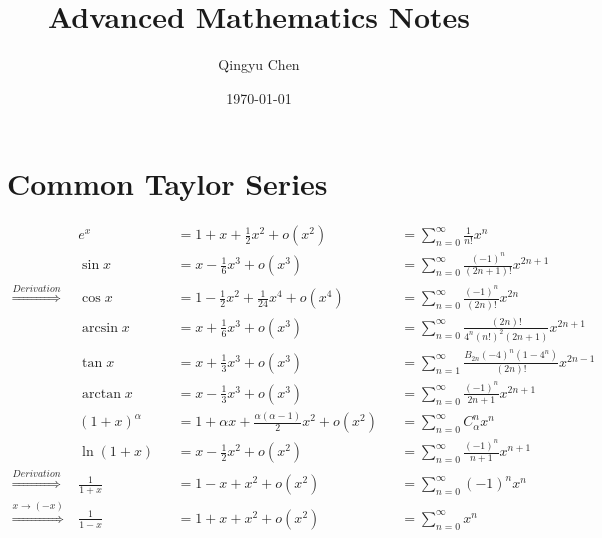 \documentclass{article}
\title{Advanced Mathematics Notes}
\author{Qingyu Chen}
\date{\today}
\begin{document}
	\large
	\setlength{\baselineskip}{4em}
	
	\renewcommand{\d}[1][x]{\ \text{d}#1}
	
	\maketitle
	
	\tableofcontents
	
	\newpage
	
	\section{Common Taylor Series}
	
	\begin{align}
		& e^x & & = 1 + x + \frac{1}{2} x^2 + o(x^2) && = \sum_{n = 0}^{\infty} \frac{1}{n!} x^n
		\\
		& \sin x & & = x - \frac{1}{6} x^3 + o(x^3) && = \sum_{n = 0}^{\infty} \frac{(-1)^n}{(2n + 1)!} x^{2n + 1}
		\\
		\stackrel{Derivation}{\Longrightarrow} \ & \cos x & & = 1 - \frac{1}{2} x^2 + \frac{1}{24} x^4 + o(x^4) && = \sum_{n = 0}^{\infty} \frac{(-1)^n}{(2n)!} x^{2n}
		\\
		& \arcsin x & & = x + \frac{1}{6} x^3 + o(x^3) && = \sum_{n = 0}^{\infty} \frac{(2n)!}{4^n (n!)^2 (2n + 1)} x^{2n + 1}
		\\
		& \tan x & & = x + \frac{1}{3} x^3 + o(x^3) && = \sum_{n = 1}^{\infty} \frac{B_{2n} (-4)^n (1 - 4^n)}{(2n)!} x^{2n - 1}
		\\
		& \arctan x & & = x - \frac{1}{3} x^3 + o(x^3) && = \sum_{n = 0}^{\infty} \frac{(-1)^n}{2n + 1} x^{2n + 1}
		\\
		& (1 + x)^\alpha & & = 1 + \alpha x + \frac{\alpha (\alpha - 1)}{2} x^2 + o(x^2) && = \sum_{n = 0}^{\infty} C_{\alpha}^{n} x^n
		\\
		& \ln{(1 + x)} & & = x - \frac{1}{2} x^2 + o(x^2) && = \sum_{n = 0}^{\infty} \frac{(-1)^n}{n + 1} x^{n + 1}
		\\
		\stackrel{Derivation}{\Longrightarrow} \ & \frac{1}{1 + x} & & = 1 - x + x^2 + o(x^2) && = \sum_{n = 0}^{\infty} (-1)^n x^n
		\\
		\stackrel{x \rightarrow (-x)}{\Longrightarrow} \ & \frac{1}{1 - x} & & = 1 + x + x^2 + o(x^2) && = \sum_{n = 0}^{\infty} x^n
	\end{align}
\end{document}
